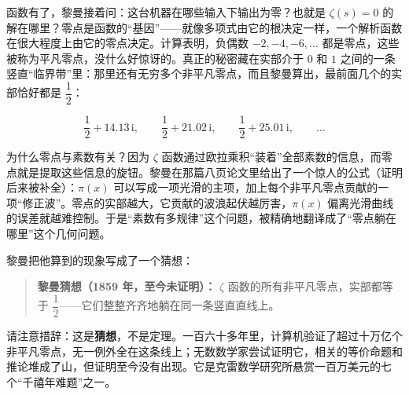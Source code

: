函数有了，黎曼接着问：这台机器在哪些输入下输出为零？也就是 $\zeta(s)=0$ 的解在哪里？零点是函数的“基因”——就像多项式由它的根决定一样，一个解析函数在很大程度上由它的零点决定。计算表明，负偶数 $-2,-4,-6,\dots$ 都是零点，这些被称为平凡零点，没什么好惊讶的。真正的秘密藏在实部介于 $0$ 和 $1$ 之间的一条竖直“临界带”里：那里还有无穷多个非平凡零点，而且黎曼算出，最前面几个的实部恰好都是 $\dfrac12$：

\[
\frac12+14.13\,\mathrm{i},\qquad
\frac12+21.02\,\mathrm{i},\qquad
\frac12+25.01\,\mathrm{i},\qquad\dots
\]

\begin{center}
\end{center}

为什么零点与素数有关？因为 $\zeta$ 函数通过欧拉乘积“装着”全部素数的信息，而零点就是提取这些信息的旋钮。黎曼在那篇八页论文里给出了一个惊人的公式（证明后来被补全）：$\pi(x)$ 可以写成一项光滑的主项，加上每个非平凡零点贡献的一项“修正波”。零点的实部越大，它贡献的波浪起伏越厉害，$\pi(x)$ 偏离光滑曲线的误差就越难控制。于是“素数有多规律”这个问题，被精确地翻译成了“零点躺在哪里”这个几何问题。

黎曼把他算到的现象写成了一个猜想：

\begin{quote}
\textbf{黎曼猜想（1859 年，至今未证明）：} $\zeta$ 函数的所有非平凡零点，实部都等于 $\dfrac12$——它们整整齐齐地躺在同一条竖直直线上。
\end{quote}

请注意措辞：这是\textbf{猜想}，不是定理。一百六十多年里，计算机验证了超过十万亿个非平凡零点，无一例外全在这条线上；无数数学家尝试证明它，相关的等价命题和推论堆成了山，但证明至今没有出现。它是克雷数学研究所悬赏一百万美元的七个“千禧年难题”之一。

